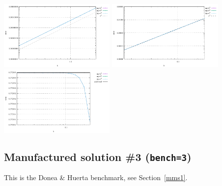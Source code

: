 \begin{center}
\includegraphics[width=5.7cm]{python_codes/fieldstone_76/results/mms2/errors_v}
\includegraphics[width=5.7cm]{python_codes/fieldstone_76/results/mms2/errors_p}
\includegraphics[width=5.7cm]{python_codes/fieldstone_76/results/mms2/vrms}
\end{center}

\subsection*{Manufactured solution \#3 ({\tt bench=3})}

This is the Donea \& Huerta benchmark, see Section~\ref{mms1}.

